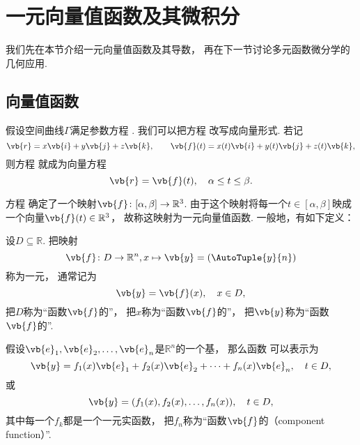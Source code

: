 \section{一元向量值函数及其微积分}
我们先在本节介绍一元向量值函数及其导数，
再在下一节讨论多元函数微分学的几何应用.

\subsection{向量值函数}
假设空间曲线\(\Gamma\)满足参数方程 .
我们可以把方程  改写成向量形式.
若记\begin{equation*}
	\vb{r}=x\vb{i}+y\vb{j}+z\vb{k},
	\qquad
	\vb{f}(t)=x(t)\vb{i}+y(t)\vb{j}+z(t)\vb{k},
\end{equation*}
则方程 
就成为向量方程\begin{equation}\label{equation:解析几何.曲面的参数方程.向量形式}
	\vb{r}=\vb{f}(t),
	\quad \alpha \leq t \leq \beta.
\end{equation}

方程 
确定了一个映射\(\vb{f}\colon [\alpha,\beta]\to\mathbb{R}^3\).
由于这个映射将每一个\(t\in[\alpha,\beta]\)映成一个向量\(\vb{f}(t)\in\mathbb{R}^3\)，
故称这映射为一元向量值函数.
一般地，有如下定义：
\begin{definition}
设\(D \subseteq \mathbb{R}\).
把映射\begin{equation*}
	\vb{f}\colon D\to\mathbb{R}^n,
	x \mapsto \vb{y}=(\AutoTuple{y}{n})
\end{equation*}称为一元，
通常记为\begin{equation}\label{equation:一元实变向量值函数.向量形式}
	\vb{y}=\vb{f}(x),
	\quad x \in D,
\end{equation}
把\(D\)称为“函数\(\vb{f}\)的”，
把\(x\)称为“函数\(\vb{f}\)的”，
把\(\vb{y}\)称为“函数\(\vb{f}\)的”.
\end{definition}

假设\(\vb{e}_1,\vb{e}_2,\dotsc,\vb{e}_n\)是\(\mathbb{R}^n\)的一个基，
那么函数  可以表示为\begin{equation}
	\vb{y}=f_1(x)\vb{e}_1+f_2(x)\vb{e}_2+\dotsb+f_n(x)\vb{e}_n,
	\quad t \in D,
\end{equation}
或\begin{equation}
	\vb{y}=(f_1(x),f_2(x),\dotsc,f_n(x)),
	\quad t \in D,
\end{equation}
其中每一个\(f_k\)都是一个一元实函数，
把\(f_n\)称为“函数\(\vb{f}\)的（component function）”.

